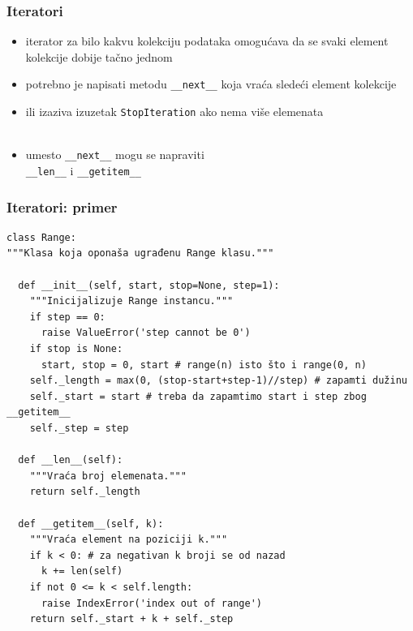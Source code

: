 \documentclass[compress]{beamer}
\begin{document}
\begin{frame}[fragile]
  \frametitle{Iteratori}
  \begin{itemize}
    \item iterator za bilo kakvu kolekciju podataka omogućava da se svaki element kolekcije dobije tačno jednom
    \item potrebno je napisati metodu \texttt{\_\_next\_\_} koja vraća sledeći element kolekcije 
    \item ili izaziva izuzetak \texttt{StopIteration} ako nema više elemenata \\ \\
    \item umesto \texttt{\_\_next\_\_} mogu se napraviti \\ \texttt{\_\_len\_\_} i \texttt{\_\_getitem\_\_}
  \end{itemize}
\end{frame}

\begin{frame}[fragile,shrink=15]
  \frametitle{Iteratori: primer}
\begin{verbatim}
class Range:
"""Klasa koja oponaša ugrađenu Range klasu."""

  def __init__(self, start, stop=None, step=1):
    """Inicijalizuje Range instancu."""
    if step == 0:
      raise ValueError('step cannot be 0')
    if stop is None:
      start, stop = 0, start # range(n) isto što i range(0, n)
    self._length = max(0, (stop-start+step-1)//step) # zapamti dužinu
    self._start = start # treba da zapamtimo start i step zbog __getitem__
    self._step = step

  def __len__(self):
    """Vraća broj elemenata."""
    return self._length

  def __getitem__(self, k):
    """Vraća element na poziciji k."""
    if k < 0: # za negativan k broji se od nazad
      k += len(self)
    if not 0 <= k < self.length:
      raise IndexError('index out of range')
    return self._start + k + self._step
\end{verbatim}
\end{frame}
\end{document}
